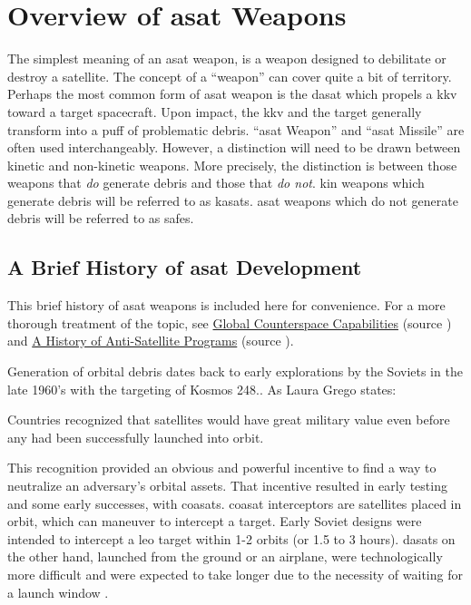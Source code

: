\section{Overview of \acf{asat} Weapons}

The simplest meaning of an \acf{asat} weapon, is a weapon designed to
debilitate or destroy a satellite.  The concept of a ``weapon'' can
cover quite a bit of territory.  Perhaps the most common form of
\ac{asat} weapon is the \ac{dasat} which propels a \ac{kkv} toward a
target spacecraft.  Upon impact, the \ac{kkv} and the target generally
transform into a puff of problematic debris.  ``\acs{asat} Weapon''
and ``\acs{asat} Missile'' are often used interchangeably.  However, a
distinction will need to be drawn between kinetic and non-kinetic
weapons.  More precisely, the distinction is between those weapons
that \emph{do} generate debris and those that \emph{do not}.  \ac{kin}
weapons which generate debris will be referred to as \acp{kasat}.
\ac{asat} weapons which do not generate debris will be referred to as
\acp{safe}.

\subsection{A Brief History of \ac{asat} Development}

This brief history of \ac{asat} weapons is included here for
convenience.  For a more thorough treatment of the topic, see
\href{https://swfound.org/media/207344/swf_global_counterspace_capabilities_2022.pdf}{Global
  Counterspace Capabilities} (source \cite{brian}) and
\href{https://www.ucsusa.org/sites/default/files/2019-09/a-history-of-ASAT-programs_lo-res.pdf}{A
  History of Anti-Satellite Programs} (source \cite{grego}).

Generation of orbital debris dates back to early explorations by the
Soviets in the late 1960's with the targeting of Kosmos
248.\cite[p05-01]{brian}.  As Laura Grego states:
\begin{blockquote}
  Countries recognized that satellites would have great military value
  even before any had been successfully launched into
  orbit.\cite[p2]{grego}
\end{blockquote}

This recognition provided an obvious and powerful incentive to find a
way to neutralize an adversary's orbital assets. That incentive
resulted in early testing and some early successes, with \acp{coasat}.
\acs{coasat} interceptors are satellites placed in orbit, which can
maneuver to intercept a target.  Early Soviet designs were intended to
intercept a \ac{leo} target within 1-2 orbits (or 1.5 to 3
hours).\cite{grego} \acp{dasat} on the other hand, launched from the
ground or an airplane, were technologically more
difficult\cite[4]{grego} and were expected to take longer due to the
necessity of waiting for a launch window \cite[3]{grego}.

